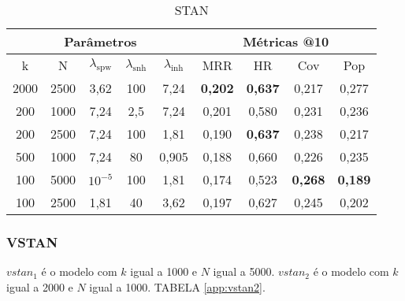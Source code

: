 \begin{table}
    \centering
    \begin{tabular}{|c|c|c|c|c|c|c|c|c|}
      \hline
      \multicolumn{5}{|c|}{Parâmetros} & \multicolumn{4}{c|}{Métricas @10} \\
      \hline
      k & N & $\lambda_{\text{spw}}$ & $\lambda_{\text{snh}}$ & $\lambda_{\text{inh}}$ & MRR & HR & Cov & Pop \\
      \hline
      2000 & 2500 & 3,62 & 100 & 7,24 & \textbf{0,202} & \textbf{0,637} & 0,217 & 0,277 \\
      \hline
      200 & 1000 & 7,24 & 2,5 & 7,24 & 0,201 & 0,580 & 0,231 & 0,236 \\
      \hline
      200 & 2500 & 7,24 & 100 & 1,81& 0,190 & \textbf{0,637} & 0,238 & 0,217 \\
      \hline
      500 & 1000 & 7,24 & 80 & 0,905 & 0,188 & 0,660 & 0,226 & 0,235 \\
      \hline
      100 & 5000 & $10^{-5}$ & 100 & 1,81 & 0,174 & 0,523 & \textbf{0,268} & \textbf{0,189} \\
      \hline
      100 & 2500 & 1,81 & 40 & 3,62 & 0,197 & 0,627 & 0,245 & 0,202 \\
      \hline

    \end{tabular}
    \label{app:stan_vasco}
    \caption{STAN}
  \end{table}


\subsubsection{VSTAN}
$vstan_1$ é o modelo com $k$ igual a 1000 e $N$ igual a 5000. 
$vstan_2$ é o modelo com $k$ igual a 2000 e $N$ igual a 1000. 
TABELA \ref{app:vstan2}.

